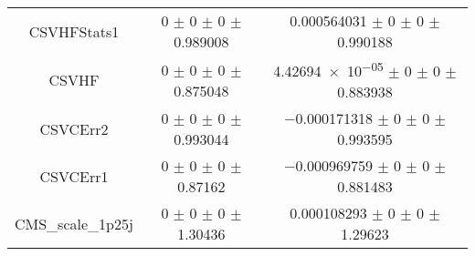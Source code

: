 \begin{table}
\begin{tabular}{ccc}
CSVHFStats1 	& \num{0} $\pm$ \num{0} $\pm$ \num{0} $\pm$ \num{0.989008} 	& \num{0.000564031} $\pm$ \num{0} $\pm$ \num{0} $\pm$ \num{0.990188}\\
CSVHF 	& \num{0} $\pm$ \num{0} $\pm$ \num{0} $\pm$ \num{0.875048} 	& \num{4.42694e-05} $\pm$ \num{0} $\pm$ \num{0} $\pm$ \num{0.883938}\\
CSVCErr2 	& \num{0} $\pm$ \num{0} $\pm$ \num{0} $\pm$ \num{0.993044} 	& \num{-0.000171318} $\pm$ \num{0} $\pm$ \num{0} $\pm$ \num{0.993595}\\
CSVCErr1 	& \num{0} $\pm$ \num{0} $\pm$ \num{0} $\pm$ \num{0.87162} 	& \num{-0.000969759} $\pm$ \num{0} $\pm$ \num{0} $\pm$ \num{0.881483}\\
CMS\_scale\_1p25j 	& \num{0} $\pm$ \num{0} $\pm$ \num{0} $\pm$ \num{1.30436} 	& \num{0.000108293} $\pm$ \num{0} $\pm$ \num{0} $\pm$ \num{1.29623}\\
\bottomrule
\end{tabular}
\end{table}